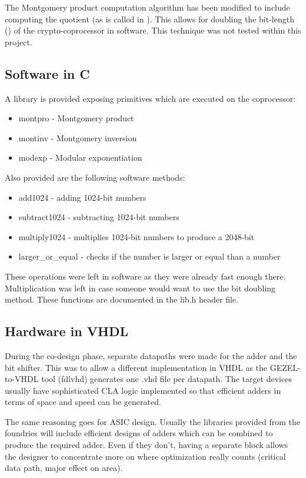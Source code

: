 The Montgomery product computation algorithm has been modified to
include computing the quotient (as is called in
\cite{monpro_doubling}). This allows for doubling the bit-length
(\cite{monpro_doubling, classic_doubling}) of the crypto-coprocessor
in software. This technique was not tested within this project.

\subsection{Software in C}

A library is provided exposing primitives which are executed on the
coprocessor:
\begin{itemize}
\item montpro - Montgomery product
\item montinv - Montgomery inversion
\item modexp - Modular exponentiation
\end{itemize}

\noindent
Also provided are the following software methods:
\begin{itemize}
\item add1024 - adding 1024-bit numbers
\item subtract1024 - subtracting 1024-bit numbers
\item multiply1024 - multiplies 1024-bit numbers to produce a 2048-bit
\item larger\_or\_equal - checks if the number is larger or equal than a number
\end{itemize}

These operations were left in software as they were already fast
enough there. Multiplication was left in case someone would want to
use the bit doubling method. These functions are documented in the
lib.h header file.

\subsection{Hardware in VHDL}

During the co-design phase, separate datapaths were made for the adder
and the bit shifter.  This was to allow a different implementation in
VHDL as the GEZEL-to-VHDL tool (fdlvhd) generates one .vhd file per
datapath. The target devices usually have sophisticated CLA logic
implemented so that efficient adders in terms of space and speed can
be generated.

The same reasoning goes for ASIC design. Usually the libraries
provided from the foundries will include efficient designs of adders
which can be combined to produce the required adder. Even if they
don't, having a separate block allows the designer to concentrate more
on where optimization really counts (critical data path, major effect
on area).

